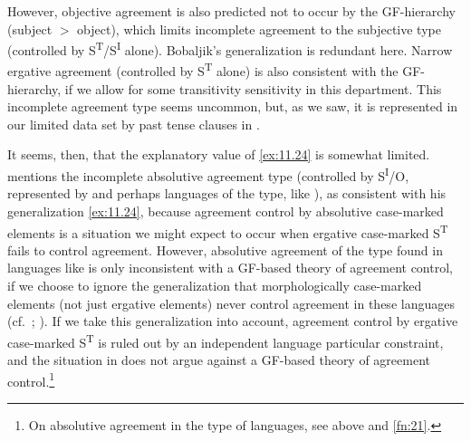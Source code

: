 \documentclass[output=paper]{langsci/langscibook}
\begin{document}
However, objective agreement is also predicted not to occur by the
\gls{GF}-hi\-er\-ar\-chy (subject $>$ object), which limits incomplete agreement to
the subjective type (controlled by S\textsuperscript{T}/S\textsuperscript{I}
alone). Bobaljik’s generalization is redundant here. Narrow ergative agreement
(controlled by S\textsuperscript{T} alone) is also consistent with the
\gls{GF}-hi\-er\-ar\-chy, if we allow for some transitivity sensitivity in this
department. This incomplete agreement type seems uncommon, but, as we saw, it
is represented in our limited data set by past tense clauses in  \citep[68]{Mulder1994}.

It seems, then, that the explanatory value of \eqref{ex:11.24} is somewhat
limited.  \citet{Bobaljik2008} mentions the incomplete absolutive agreement
type (controlled by S\textsuperscript{I}/O, represented by  and
perhaps languages of the  type, like ), as consistent
with his generalization \eqref{ex:11.24}, because agreement control by
absolutive case-marked elements is a situation we might expect to occur when
ergative case-marked S\textsuperscript{T} fails to control agreement. However,
absolutive agreement of the type found in languages like  is only
inconsistent with a \gls{GF}-based theory of agreement control, if we choose to
ignore the generalization that morphologically case-marked elements (not just
ergative elements) never control agreement in these languages (cf.\
\citealt[446]{Pandharipande1997}; \citealt{Woolford2000b}). If we take this
generalization into account, agreement control by ergative case-marked
S\textsuperscript{T} is ruled out by an independent language particular
constraint, and the situation in \ili{Marathi} does not argue against a
\gls{GF}-based theory of agreement control.\footnote{On absolutive agreement in
the \ili{Tsez} type of languages, see \Cref{sec:11.5.2} above and
\cref{fn:21}.}
\end{document}
